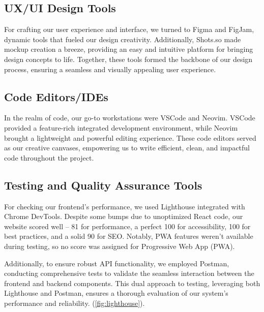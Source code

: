 \documentclass[12pt,a4paper]{article}
\begin{document}
\begin{spacing}{1.5}
    \subsection{UX/UI Design Tools}
    For crafting our user experience and interface, we turned to Figma and FigJam,
    dynamic tools that fueled our design creativity. Additionally, Shots.so made
    mockup creation a breeze, providing an easy and intuitive platform for bringing
    design concepts to life. Together, these tools formed the backbone of our
    design process, ensuring a seamless and visually appealing user experience.

    \subsection{Code Editors/IDEs}
    In the realm of code, our go-to workstations were VSCode and Neovim. VSCode
    provided a feature-rich integrated development environment, while Neovim
    brought a lightweight and powerful editing experience. These code editors
    served as our creative canvases, empowering us to write efficient, clean, and
    impactful code throughout the project.

    \subsection{Testing and Quality Assurance Tools}
    For checking our frontend's performance, we used Lighthouse integrated with
    Chrome DevTools. Despite some bumps due to unoptimized React code, our website
    scored well – 81 for performance, a perfect 100 for accessibility, 100 for best
    practices, and a solid 90 for SEO. Notably, PWA features weren't available
    during testing, so no score was assigned for Progressive Web App (PWA).

    Additionally, to ensure robust API functionality, we employed Postman,
    conducting comprehensive tests to validate the seamless interaction between the
    frontend and backend components. This dual approach to testing, leveraging both
    Lighthouse and Postman, ensures a thorough evaluation of our system's
    performance and reliability. (\autoref{fig:lighthouse}).


\end{spacing}
\end{document}
